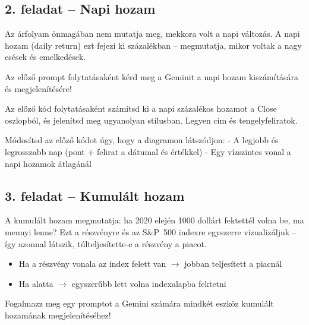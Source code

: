 \documentclass[11pt,a4paper]{article}
\newcommand{\lbl}[1]{\vspace{6pt}\noindent{\small\bfseries\textcolor{labelcolor}{#1}}\par\smallskip}
\begin{document}
\bigskip

\subsection{2. feladat -- Napi hozam}

\noindent Az árfolyam önmagában nem mutatja meg, mekkora volt a napi változás.
A napi hozam (daily return) ezt fejezi ki százalékban -- megmutatja,
mikor voltak a nagy esések és emelkedések.

\bigskip

\lbl{Feladat:}
Az előző prompt folytatásaként kérd meg a Geminit a napi hozam
kiszámítására és megjelenítésére!

\begin{prompt}
Az előző kód folytatásaként számítsd ki a napi százalékos hozamot
a Close oszlopból, és jelenítsd meg ugyanolyan stílusban.
Legyen cím és tengelyfeliratok.
\end{prompt}

\medskip\lbl{Módosítás -- statisztikák kiemelése!}

\begin{prompt}
Módosítsd az előző kódot úgy, hogy a diagramon látszódjon:
- A legjobb és legrosszabb nap (pont + felirat a dátumal és értékkel)
- Egy vízszintes vonal a napi hozamok átlagánál
\end{prompt}

\bigskip

\subsection{3. feladat -- Kumulált hozam}

\noindent A kumulált hozam megmutatja: ha 2020 elején 1000 dollárt fektettél volna be,
ma mennyi lenne? Ezt a részvényre és az S\&P~500 indexre egyszerre vizualizáljuk --
így azonnal látszik, túlteljesítette-e a részvény a piacot.

\begin{itemize}[noitemsep, topsep=4pt]
  \item Ha a részvény vonala az index felett van $\rightarrow$ jobban teljesített a piacnál
  \item Ha alatta $\rightarrow$ egyszerűbb lett volna indexalapba fektetni
\end{itemize}

\bigskip

\lbl{Feladat:}
Fogalmazz meg egy promptot a Gemini számára mindkét eszköz kumulált hozamának
megjelenítéséhez!
\end{document}

